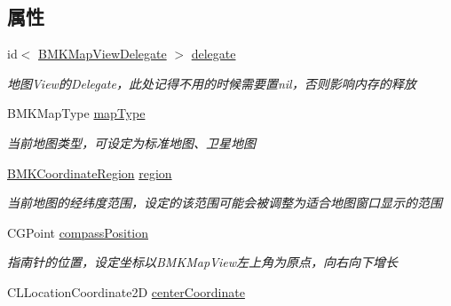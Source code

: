 \subsection*{属性}
\begin{DoxyCompactItemize}
\item 
\hypertarget{interface_b_m_k_map_view_a80806d05b9f82dcf5630110b5d20dc2c}{}id$<$ \hyperlink{protocol_b_m_k_map_view_delegate-p}{B\+M\+K\+Map\+View\+Delegate} $>$ \hyperlink{interface_b_m_k_map_view_a80806d05b9f82dcf5630110b5d20dc2c}{delegate}\label{interface_b_m_k_map_view_a80806d05b9f82dcf5630110b5d20dc2c}

\begin{DoxyCompactList}\small\item\em 地图\+View的\+Delegate，此处记得不用的时候需要置nil，否则影响内存的释放 \end{DoxyCompactList}\item 
\hypertarget{interface_b_m_k_map_view_add5778e2d3c080b0ae2ce63538082fea}{}B\+M\+K\+Map\+Type \hyperlink{interface_b_m_k_map_view_add5778e2d3c080b0ae2ce63538082fea}{map\+Type}\label{interface_b_m_k_map_view_add5778e2d3c080b0ae2ce63538082fea}

\begin{DoxyCompactList}\small\item\em 当前地图类型，可设定为标准地图、卫星地图 \end{DoxyCompactList}\item 
\hypertarget{interface_b_m_k_map_view_ae54e847bb82b4e087ced8dc399a2d020}{}\hyperlink{struct_b_m_k_coordinate_region}{B\+M\+K\+Coordinate\+Region} \hyperlink{interface_b_m_k_map_view_ae54e847bb82b4e087ced8dc399a2d020}{region}\label{interface_b_m_k_map_view_ae54e847bb82b4e087ced8dc399a2d020}

\begin{DoxyCompactList}\small\item\em 当前地图的经纬度范围，设定的该范围可能会被调整为适合地图窗口显示的范围 \end{DoxyCompactList}\item 
\hypertarget{interface_b_m_k_map_view_adad44db2dcfaa2d92e5eabef40f32bd8}{}C\+G\+Point \hyperlink{interface_b_m_k_map_view_adad44db2dcfaa2d92e5eabef40f32bd8}{compass\+Position}\label{interface_b_m_k_map_view_adad44db2dcfaa2d92e5eabef40f32bd8}

\begin{DoxyCompactList}\small\item\em 指南针的位置，设定坐标以\+B\+M\+K\+Map\+View左上角为原点，向右向下增长 \end{DoxyCompactList}\item 
\hypertarget{interface_b_m_k_map_view_aa19c4d034a7861589044326107985632}{}C\+L\+Location\+Coordinate2\+D \hyperlink{interface_b_m_k_map_view_aa19c4d034a7861589044326107985632}{center\+Coordinate}\label{interface_b_m_k_map_view_aa19c4d034a7861589044326107985632}


\end{DoxyCompactItemize}
